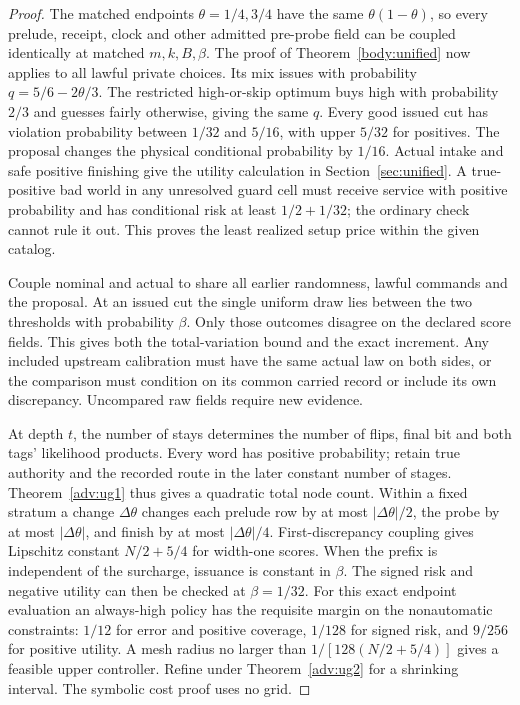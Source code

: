\begin{proof}
The matched endpoints \(\theta=1/4,3/4\) have the same \(\theta(1-\theta)\), so every prelude, receipt, clock and other admitted pre-probe field can be coupled identically at matched \(m,k,B,\beta\). The proof of Theorem~\ref{body:unified} now applies to all lawful private choices. Its mix issues with probability \(q=5/6-2\theta/3\). The restricted high-or-skip optimum buys high with probability \(2/3\) and guesses fairly otherwise, giving the same \(q\). Every good issued cut has violation probability between \(1/32\) and \(5/16\), with upper \(5/32\) for positives. The proposal changes the physical conditional probability by \(1/16\). Actual intake and safe positive finishing give the utility calculation in Section~\ref{sec:unified}. A true-positive bad world in any unresolved guard cell must receive service with positive probability and has conditional risk at least \(1/2+1/32\); the ordinary check cannot rule it out. This proves the least realized setup price within the given catalog.

Couple nominal and actual to share all earlier randomness, lawful commands and the proposal. At an issued cut the single uniform draw lies between the two thresholds with probability \(\beta\). Only those outcomes disagree on the declared score fields. This gives both the total-variation bound and the exact increment. Any included upstream calibration must have the same actual law on both sides, or the comparison must condition on its common carried record or include its own discrepancy. Uncompared raw fields require new evidence.

At depth \(t\), the number of stays determines the number of flips, final bit and both tags' likelihood products. Every word has positive probability; retain true authority and the recorded route in the later constant number of stages. Theorem~\ref{adv:ug1} thus gives a quadratic total node count. Within a fixed stratum a change \(\Delta\theta\) changes each prelude row by at most \(|\Delta\theta|/2\), the probe by at most \(|\Delta\theta|\), and finish by at most \(|\Delta\theta|/4\). First-discrepancy coupling gives Lipschitz constant \(N/2+5/4\) for width-one scores. When the prefix is independent of the surcharge, issuance is constant in \(\beta\). The signed risk and negative utility can then be checked at \(\beta=1/32\). For this exact endpoint evaluation an always-high policy has the requisite margin on the nonautomatic constraints: \(1/12\) for error and positive coverage, \(1/128\) for signed risk, and \(9/256\) for positive utility. A mesh radius no larger than \(1/[128(N/2+5/4)]\) gives a feasible upper controller. Refine under Theorem~\ref{adv:ug2} for a shrinking interval. The symbolic cost proof uses no grid.


\end{proof}
